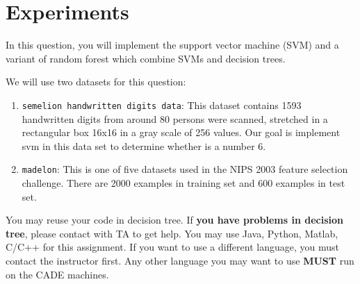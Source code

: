 \section{Experiments}
\label{sec:q3}

In this question, you will implement the support vector machine (SVM)
and a variant of random forest which combine SVMs and decision trees.

We will use two datasets for this question:
\begin{enumerate}
\item {\tt semelion handwritten digits data}: This dataset contains
  1593 handwritten digits from around 80 persons were scanned,
  stretched in a rectangular box 16x16 in a gray scale of 256 values.
  Our goal is implement svm in this data set to determine whether is a
  number 6.
\item {\tt madelon}: This is one of five datasets used in the NIPS
  2003 feature selection challenge. There are 2000 examples in
  training set and 600 examples in test set. 
\end{enumerate}

You may reuse your code in decision tree. If \textbf{you have problems
  in decision tree}, please contact with TA to get help. You may use
Java, Python, Matlab, C/C++ for this assignment. If you want to use a
different language, you must contact the instructor first. Any other
language you may want to use \textbf{MUST} run on the CADE machines.

